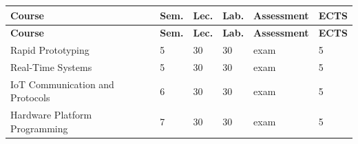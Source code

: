 \documentclass[12pt,a4paper]{article}
\newcommand{\thdrule}{\noalign{\global\setlength{\extrarowheight}{0pt}}}
\newcommand{\thdend}{\noalign{\global\setlength{\extrarowheight}{4pt}}}
\begin{document}
{\scriptsize
\begin{longtable}{m{6.5cm}m{0.7cm}m{1cm}m{1cm}m{1.7cm}m{0.7cm}}
\thdrule\toprule
\rowcolor{pjatkRed}
{\color{white}\footnotesize\textbf{\vphantom{Ag}Course}} & {\color{white}\footnotesize\textbf{\vphantom{Ag}Sem.}} & {\color{white}\footnotesize\textbf{\vphantom{Ag}Lec.}} & {\color{white}\footnotesize\textbf{\vphantom{Ag}Lab.}} & {\color{white}\footnotesize\textbf{\vphantom{Ag}Assessment}} & {\color{white}\footnotesize\textbf{\vphantom{Ag}ECTS}} \\
\midrule\thdend
\endfirsthead
\thdrule\toprule
\rowcolor{pjatkRed}
{\color{white}\footnotesize\textbf{\vphantom{Ag}Course}} & {\color{white}\footnotesize\textbf{\vphantom{Ag}Sem.}} & {\color{white}\footnotesize\textbf{\vphantom{Ag}Lec.}} & {\color{white}\footnotesize\textbf{\vphantom{Ag}Lab.}} & {\color{white}\footnotesize\textbf{\vphantom{Ag}Assessment}} & {\color{white}\footnotesize\textbf{\vphantom{Ag}ECTS}} \\
\midrule\thdend
\endhead
\rowcolor{tableRowLight} Rapid Prototyping & 5 & 30 & 30 & {\scriptsize exam} & 5 \\
\rowcolor{tableRowAlt} Real-Time Systems & 5 & 30 & 30 & {\scriptsize exam} & 5 \\
\rowcolor{tableRowLight} IoT Communication and Protocols & 6 & 30 & 30 & {\scriptsize exam} & 5 \\
\rowcolor{tableRowAlt} Hardware Platform Programming & 7 & 30 & 30 & {\scriptsize exam} & 5 \\
\bottomrule
\end{longtable}}
\end{document}
